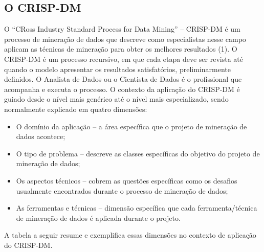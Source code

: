 \documentclass[conference,compsoc]{IEEEtran}
\begin{document}
\subsection{O CRISP-DM}

O “CRoss Industry Standard Process for Data Mining” – CRISP-DM
é um processo de mineração de dados que descreve como especialistas
nesse campo aplicam as técnicas de mineração para obter os melhores
resultados (1). O CRISP-DM é um processo recursivo, em que cada
etapa deve ser revista até quando o modelo apresentar os resultados
satisfatórios, preliminarmente definidos. O Analista de Dados ou o
Cientista de Dados é o profissional que acompanha e executa o
processo.
O contexto da aplicação do CRISP-DM \cite{Crisp2000} é guiado desde o nível 
mais genérico até o nível mais especializado, sendo normalmente
explicado em quatro dimensões:

\begin{itemize}
 \item O domínio da aplicação -- a área específica que o projeto de mineração de dados acontece;
 \item O tipo de problema -- descreve as classes específicas do objetivo do projeto de mineração de dados;
 \item Os aspectos técnicos -- cobrem as questões específicas como os desafios usualmente encontrados durante o processo de mineração de dados; 
 \item As ferramentas e técnicas -- dimensão específica que cada ferramenta/técnica de mineração de dados é aplicada durante o projeto.
\end{itemize}

A tabela a seguir resume e exemplifica essas dimensões no contexto de aplicação do CRISP-DM.
\end{document}
